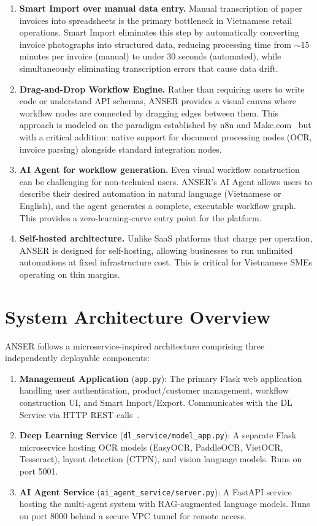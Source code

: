 \documentclass[11pt,a4paper]{report}
\begin{document}
\begin{enumerate}
  \item \textbf{Smart Import over manual data entry.} Manual transcription of paper invoices into spreadsheets is the primary bottleneck in Vietnamese retail operations. Smart Import eliminates this step by automatically converting invoice photographs into structured data, reducing processing time from $\sim$15 minutes per invoice (manual) to under 30 seconds (automated), while simultaneously eliminating transcription errors that cause data drift.

  \item \textbf{Drag-and-Drop Workflow Engine.} Rather than requiring users to write code or understand API schemas, ANSER provides a visual canvas where workflow nodes are connected by dragging edges between them. This approach is modeled on the paradigm established by n8n and Make.com~\cite{n8n, makecom} but with a critical addition: native support for document processing nodes (OCR, invoice parsing) alongside standard integration nodes.

  \item \textbf{AI Agent for workflow generation.} Even visual workflow construction can be challenging for non-technical users. ANSER's AI Agent allows users to describe their desired automation in natural language (Vietnamese or English), and the agent generates a complete, executable workflow graph. This provides a zero-learning-curve entry point for the platform.

  \item \textbf{Self-hosted architecture.} Unlike SaaS platforms that charge per operation, ANSER is designed for self-hosting, allowing businesses to run unlimited automations at fixed infrastructure cost. This is critical for Vietnamese SMEs operating on thin margins.
\end{enumerate}

\section{System Architecture Overview}

ANSER follows a microservice-inspired architecture comprising three independently deployable components:

\begin{enumerate}
  \item \textbf{Management Application} (\texttt{app.py}): The primary Flask web application handling user authentication, product/customer management, workflow construction UI, and Smart Import/Export. Communicates with the DL Service via HTTP REST calls~\cite{flask}.
  \item \textbf{Deep Learning Service} (\texttt{dl\_service/model\_app.py}): A separate Flask microservice hosting OCR models (EasyOCR, PaddleOCR, VietOCR, Tesseract), layout detection (CTPN), and vision language models. Runs on port 5001.
  \item \textbf{AI Agent Service} (\texttt{ai\_agent\_service/server.py}): A FastAPI service hosting the multi-agent system with RAG-augmented language models. Runs on port 8000 behind a secure VPC tunnel for remote access.
\end{enumerate}
\end{document}
